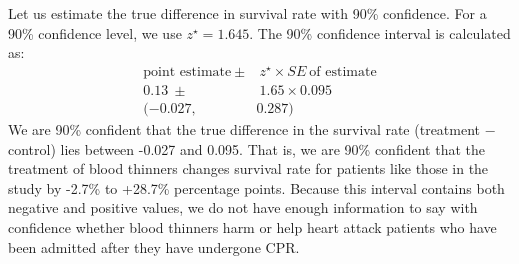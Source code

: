 Let us estimate the true difference in survival rate with 90\% confidence.  For a 90\% confidence level, we use $z^{\star} = 1.645$.  The 90\% confidence interval is calculated as:
  \begin{align*}
  \text{point estimate} \ \pm&\ z^{\star} \times SE\ \text{of estimate}\\
     0.13 \ \pm&\ 1.65\times 0.095\\
 (-0.027,\ & 0.287)
  \end{align*}
We are 90\% confident that the true difference in the survival rate (treatment $-$ control) lies between -0.027 and 0.095.  That is, we are 90\% confident that the treatment of blood thinners changes survival rate for patients like those in the study by -2.7\% to +28.7\% percentage points.  Because this interval contains both negative and positive values, we do not have enough information to say
  with confidence whether blood thinners harm or help
  heart attack patients who have been admitted after
  they have undergone CPR.






